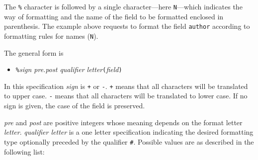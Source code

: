 \documentclass[11pt,a4paper]{scrbook}
\begin{document}
The \texttt{\%} character is followed by a single character---here
\verb|N|---which indicates the way of formatting and the name of the field to
be formatted enclosed in parenthesis. The example above requests to format the
field \verb|author| according to formatting rules for names (\verb|N|).

The general form is

\begin{itemize}
  \item [] \texttt{\%}\textit{sign pre.post qualifier letter}\texttt{(}\textit{field}\texttt{)}
\end{itemize}

In this specification \textit{sign} is \texttt{+} or \texttt{-}. \texttt{+}
means that all characters will be translated to upper case. \texttt{-} means
that all characters will be translated to lower case. If no sign is given, the
case of the field is preserved.

\textit{pre} and \textit{post} are positive integers whose meaning depends on
the format letter \textit{letter}. \textit{qualifier letter} is a one letter
specification indicating the desired formatting type optionally preceded by
the qualifier \verb|#|. Possible values are as described in the following
list:
\end{document}

